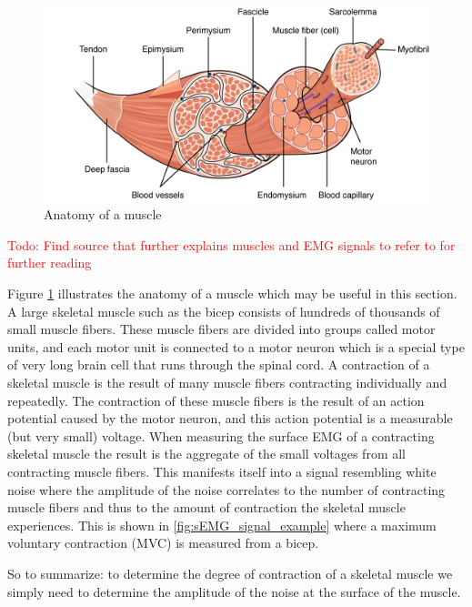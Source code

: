\begin{figure}[h!t]
	\begin{center}
		\includegraphics[width=1.0\columnwidth]{images/muscle_anatomy.png}
	\end{center}
	\caption{Anatomy of a muscle \cite{muscle_anatomy}}
	\label{fig:muscle_anatomy}
\end{figure}

\textcolor{red}{Todo: Find source that further explains muscles and EMG signals to refer to for further reading}

Figure \ref{fig:muscle_anatomy} illustrates the anatomy of a muscle which may be useful in this section. 
A large skeletal muscle such as the bicep consists of hundreds of thousands of small muscle fibers. These muscle fibers are divided into groups called motor units, and each motor unit is connected to a motor neuron which is a special type of very long brain cell that runs through the spinal cord. A contraction of a skeletal muscle is the result of many muscle fibers contracting individually and repeatedly. The contraction of these muscle fibers is the result of an action potential caused by the motor neuron, and this action potential is a measurable (but very small) voltage. When measuring the surface EMG of a contracting skeletal muscle the result is the aggregate of the small voltages from all contracting muscle fibers. This manifests itself into a signal resembling white noise where the amplitude of the noise correlates to the number of contracting muscle fibers and thus to the amount of contraction the skeletal muscle experiences. This is shown in \ref{fig:sEMG_signal_example} where a maximum voluntary contraction (MVC) is measured from a bicep.
 
So to summarize: to determine the degree of contraction of a skeletal muscle we simply need to determine the amplitude of the noise at the surface of the muscle.

